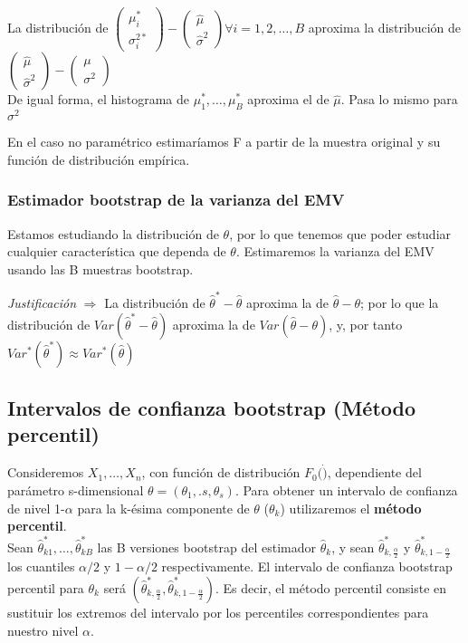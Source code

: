 \noindent La distribución de $\begin{pmatrix}\mu^*_i \\ \sigma^{2*}_i\end{pmatrix}-\begin{pmatrix}\hat\mu \\ \hat\sigma^{2}\end{pmatrix}\forall i=1,2,\dots,B$ aproxima la distribución de $\begin{pmatrix}\hat\mu \\ \hat\sigma^{2}\end{pmatrix}-\begin{pmatrix}\mu \\ \sigma^{2}\end{pmatrix}$\\
De igual forma, el histograma de $\mu^*_1,\dots,\mu^*_B$ aproxima el de $\hat\mu$. Pasa lo mismo para $\sigma^2$

En el caso no paramétrico estimaríamos F a partir de la muestra original y su función de distribución empírica.

\subsubsection{Estimador bootstrap de la varianza del EMV}

Estamos estudiando la distribución de $\theta$, por lo que tenemos que poder estudiar cualquier característica que dependa de $\theta$. Estimaremos la varianza del EMV usando las B muestras bootstrap.

\textit{Justificación} $\Longrightarrow$ La distribución de $\hat\theta^*-\hat\theta$ aproxima la de $\hat\theta-\theta$; por lo que la distribución de $Var(\hat\theta^*-\hat\theta)$ aproxima la de $Var(\hat\theta-\theta)$, y, por tanto 
$Var^*(\hat\theta^*)\approx Var^*(\hat\theta)$

\subsection{Intervalos de confianza bootstrap (Método percentil)}
Consideremos $X_1,\dots,X_n$, con función de distribución $F_0(\dot)$, dependiente del parámetro s-dimensional $\theta=(\theta_1,.s,\theta_s)$. Para obtener un intervalo de confianza de nivel 1-$\alpha$ para la k-ésima componente de $\theta$ ($\theta_k$) utilizaremos el \textbf{método percentil}.\\

Sean $\hat\theta_{k1}^*,\dots,\hat\theta_{kB}^*$ las B versiones bootstrap del estimador $\hat\theta_k$, y sean $\hat\theta^*_{k,\frac{\alpha}{2}}$ y $\hat\theta^*_{k,1-\frac{\alpha}{2}}$ los cuantiles $\alpha/2$ y $1-\alpha/2$ respectivamente.
El intervalo de confianza bootstrap percentil para $\theta_k$ será $\left(\hat\theta^*_{k,\frac{\alpha}{2}},\hat\theta^*_{k,1-\frac{\alpha}{2}} \right)$. Es decir, el método percentil consiste en sustituir los extremos del intervalo por los percentiles correspondientes para nuestro nivel $\alpha$.

